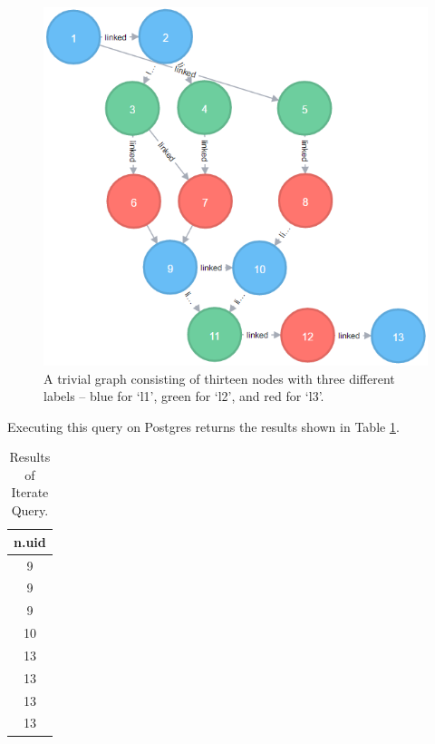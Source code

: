 \documentclass[letterpaper]{ltxdoc}
\begin{document}
\begin{figure}[h]
\centerline{\includegraphics[scale=0.7]{iterateGraph.png}}
\caption{A trivial graph consisting of thirteen nodes with three different labels -- blue for `l1', green for `l2', and red for `l3'.}
\label{iterGraphFig}
\end{figure}

\newpage

Executing this query on Postgres returns the results shown in Table \ref{table:queryIter}.

\begin{table}[!h]
\caption{Results of Iterate Query.} %
\centering %
\begin{tabular}{c} %
\hline\hline %
n.uid \\ [0.5ex] %
\hline %
9 \\
9 \\
9 \\
10 \\
13 \\
13 \\
13 \\
13 \\ [1ex] %
\hline %
\end{tabular}
\label{table:queryIter} %
\end{table}
\end{document}
